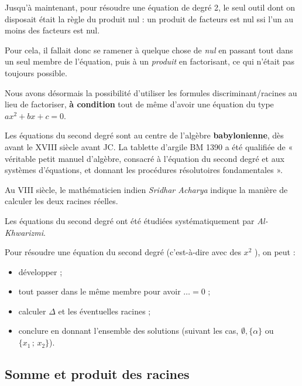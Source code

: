\documentclass[a4paper,11pt]{article}
\begin{document}
\begin{cidee}
Jusqu'à maintenant, pour résoudre une équation de degré 2, le seul outil dont on disposait était la \og règle du produit nul \fg{}  : un produit de facteurs est nul ssi l'un au moins des facteurs est nul.

Pour cela, il fallait donc se ramener à quelque chose de \emph{nul} en passant tout dans un seul membre de l'équation, puis à un \emph{produit} en factorisant, ce qui n'était pas toujours possible.

Nous avons désormais la possibilité d'utiliser les formules discriminant/racines au lieu de factoriser, \textbf{à condition} tout de même d'avoir une équation du type $ax^2+bx+c=0$.
\end{cidee}

\begin{chistoire}
Les équations du second degré sont au centre de l'algèbre \textbf{babylonienne}, dès avant le XVIII siècle avant JC. La tablette d'argile BM 1390 a été qualifiée de « véritable petit manuel d'algèbre, consacré à l'équation du second degré et aux systèmes d'équations, et donnant les procédures résolutoires fondamentales ».

Au VIII siècle, le mathématicien indien \textit{Sridhar Acharya} indique la manière de calculer les deux racines réelles.

Les équations du second degré ont été étudiées systématiquement par \textit{Al-Khwarizmi}.
\end{chistoire}

\begin{cmethode}
Pour résoudre une équation du second degré (c'est-à-dire \og avec des $x^2$ \fg), on peut :
\begin{itemize}
	\item développer ;
	\item tout passer dans le même membre pour avoir $\ldots=0$ ;
	\item calculer $\Delta$ et les éventuelles racines ;
	\item conclure en donnant l'ensemble des solutions (suivant les cas, $\emptyset, \{\alpha\}$ ou $\{x_1\,;\,x_2\}$).
\end{itemize}
\end{cmethode}

\subsection{Somme et produit des racines}
\end{document}
